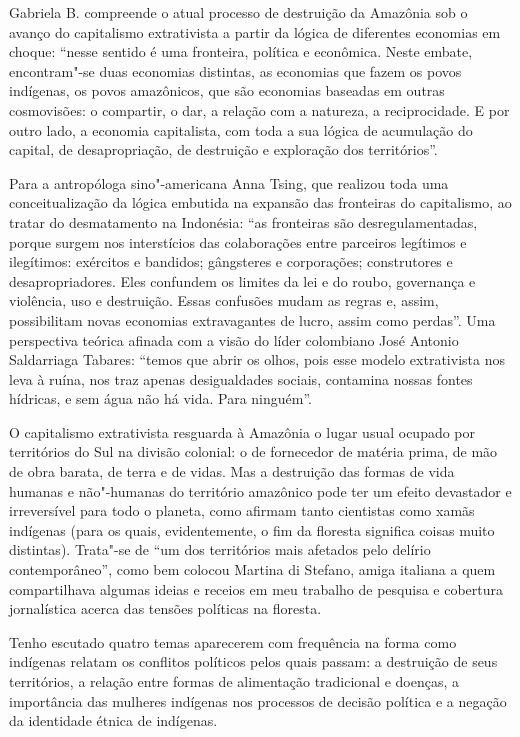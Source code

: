 Gabriela B. compreende o atual processo de destruição da Amazônia sob o
avanço do capitalismo extrativista a partir da lógica de diferentes
economias em choque: ``nesse sentido é uma fronteira, política e
econômica. Neste embate, encontram"-se duas economias distintas, as
economias que fazem os povos indígenas, os povos amazônicos, que são
economias baseadas em outras cosmovisões: o compartir, o dar, a relação
com a natureza, a reciprocidade. E por outro lado, a economia
capitalista, com toda a sua lógica de acumulação do capital, de
desapropriação, de destruição e exploração dos territórios''.

Para a antropóloga sino"-americana Anna Tsing, que realizou toda uma
conceitualização da lógica embutida na expansão das fronteiras do
capitalismo, ao tratar do desmatamento na Indonésia: ``as fronteiras são desregulamentadas, porque surgem nos interstícios das colaborações entre parceiros legítimos e ilegítimos: exércitos e bandidos; gângsteres e corporações; construtores e desapropriadores. Eles confundem os limites da lei e do roubo, governança e  violência, uso e destruição. Essas confusões mudam as regras e, assim, possibilitam novas economias extravagantes de lucro, assim como perdas''. %
Uma perspectiva
teórica afinada com a visão do líder colombiano José Antonio Saldarriaga
Tabares: ``temos que abrir os olhos, pois esse modelo extrativista nos
leva à ruína, nos traz apenas desigualdades sociais, contamina nossas
fontes hídricas, e sem água não há vida. Para ninguém''.

O capitalismo extrativista resguarda à Amazônia o lugar usual ocupado
por territórios do Sul na divisão colonial: o de fornecedor de matéria
prima, de mão de obra barata, de terra e de vidas. Mas a destruição das
formas de vida humanas e não"-humanas do território amazônico pode ter um
efeito devastador e irreversível para todo o planeta, como afirmam tanto
cientistas como xamãs indígenas (para os quais, evidentemente, o fim
da floresta significa coisas muito distintas). Trata"-se de ``um dos
territórios mais afetados pelo delírio contemporâneo'', como bem colocou
Martina di Stefano, amiga italiana a quem compartilhava algumas ideias e
receios em meu trabalho de pesquisa e cobertura jornalística acerca das tensões
políticas na floresta.

\asterisc

Tenho escutado quatro temas aparecerem com frequência na forma como indígenas relatam os
conflitos políticos pelos quais passam: a destruição de seus territórios, a relação entre formas de alimentação tradicional e doenças, a importância das mulheres indígenas
nos processos de decisão política e a negação da identidade étnica de
indígenas.

